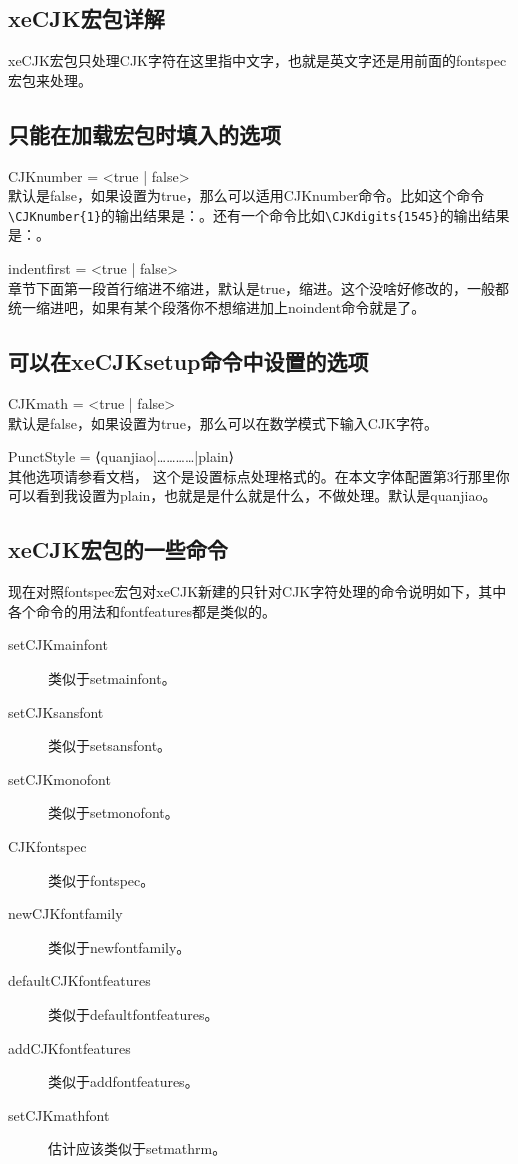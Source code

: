 \documentclass[12pt,oneside]{book}
\begin{document}
\begin{common-format}
\subsection{xeCJK宏包详解}
xeCJK宏包只处理CJK字符在这里指中文字，也就是英文字还是用前面的fontspec宏包来处理。

\subsection{只能在加载宏包时填入的选项}
CJKnumber = <true | false> \\
默认是false，如果设置为true，那么可以适用CJKnumber命令。比如这个命令\verb+\CJKnumber{1}+的输出结果是：。还有一个命令比如\verb+\CJKdigits{1545}+的输出结果是：。

indentfirst = <true | false>\\
章节下面第一段首行缩进不缩进，默认是true，缩进。这个没啥好修改的，一般都统一缩进吧，如果有某个段落你不想缩进加上noindent命令就是了。

\subsection{可以在xeCJKsetup命令中设置的选项}
CJKmath = <true | false>\\
默认是false，如果设置为true，那么可以在数学模式下输入CJK字符。

PunctStyle = {⟨quanjiao|…………|plain⟩}\\
其他选项请参看文档， 这个是设置标点处理格式的。在本文字体配置第3行那里你可以看到我设置为plain，也就是是什么就是什么，不做处理。默认是quanjiao。

\subsection{xeCJK宏包的一些命令}
现在对照fontspec宏包对xeCJK新建的只针对CJK字符处理的命令说明如下，其中各个命令的用法和fontfeatures都是类似的。
\begin{description}
\item[setCJKmainfont] 类似于setmainfont。
\item[setCJKsansfont] 类似于setsansfont。
\item[setCJKmonofont] 类似于setmonofont。
\item[CJKfontspec] 类似于fontspec。
\item[newCJKfontfamily] 类似于newfontfamily。
\item[defaultCJKfontfeatures] 类似于defaultfontfeatures。
\item[addCJKfontfeatures] 类似于addfontfeatures。
\item[setCJKmathfont] 估计应该类似于setmathrm。
\end{description}


\end{common-format}
\end{document}
